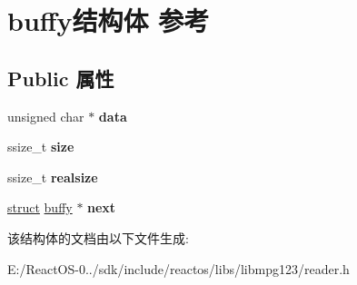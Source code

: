 \hypertarget{structbuffy}{}\section{buffy结构体 参考}
\label{structbuffy}
\subsection*{Public 属性}
\begin{DoxyCompactItemize}
\item 
\mbox{\label{structbuffy_abdd0a85e7a085b6c8e87bbd578b987e3}} 
unsigned char $\ast$ {\bfseries data}
\item 
\mbox{\label{structbuffy_aee37bbe36fecda58f7dd3b5a0ab7d7d6}} 
ssize\+\_\+t {\bfseries size}
\item 
\mbox{\label{structbuffy_abc3df962be2bc4fb927bdcf59d5ade4d}} 
ssize\+\_\+t {\bfseries realsize}
\item 
\mbox{\label{structbuffy_a0f08f36652e3d1bc0fd0dbe1c27a2eae}} 
\hyperlink{interfacestruct}{struct} \hyperlink{structbuffy}{buffy} $\ast$ {\bfseries next}
\end{DoxyCompactItemize}


该结构体的文档由以下文件生成\+:\begin{DoxyCompactItemize}
\item 
E\+:/\+React\+O\+S-\/0../sdk/include/reactos/libs/libmpg123/reader.\+h\end{DoxyCompactItemize}
